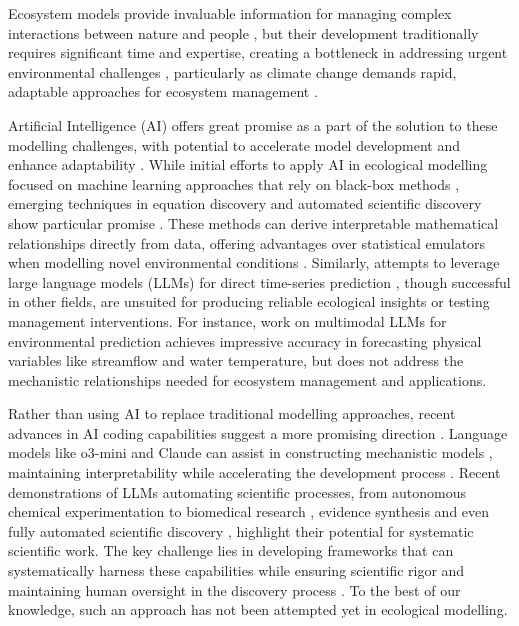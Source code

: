 Ecosystem models provide invaluable information for managing complex interactions between nature and people \citep{McCarthy2004, Holden2016}, but their development traditionally requires significant time and expertise, creating a bottleneck in addressing urgent environmental challenges \citep{Dichmont2017,Holden2024b}, particularly as climate change demands rapid, adaptable approaches for ecosystem management \citep{weiskopf2020climate,malhi2020climate}.

Artificial Intelligence (AI) offers great promise as a part of the solution to these modelling challenges, with potential to accelerate model development and enhance adaptability \citep{Spillias2024}. While initial efforts to apply AI in ecological modelling focused on machine learning approaches that rely on black-box methods \citep{morales2024developing}, emerging techniques in equation discovery and automated scientific discovery show particular promise \citep{Huntingford_Nicoll_Klein_Ahmad_2024,floryan2022data}. These methods can derive interpretable mathematical relationships directly from data, offering advantages over statistical emulators when modelling novel environmental conditions \citep{Schaeffer_2017,chen2024constructing,karniadakis2021physics}. Similarly, attempts to leverage large language models (LLMs) for direct time-series prediction \citep{zhang2024large,su2024large,hassani2024predictions,gandhi2024generative,bylund2024chatgpt,cao2023tempo,li2024lite,garza2023timegpt}, though successful in other fields, are unsuited for producing reliable ecological insights or testing management interventions. For instance, work on multimodal LLMs for environmental prediction \citep{li2024lite} achieves impressive accuracy in forecasting physical variables like streamflow and water temperature, but does not address the mechanistic relationships needed for ecosystem management and applications.

Rather than using AI to replace traditional modelling approaches, recent advances in AI coding capabilities suggest a more promising direction \citep{Xu2021}. Language models like o3-mini and Claude can assist in constructing mechanistic models \citep{Spillias2024}, maintaining interpretability while accelerating the development process \citep{TheRoyalSociety2024}. Recent demonstrations of LLMs automating scientific processes, from autonomous chemical experimentation \citep{burger2023autonomous} to biomedical research \citep{wang2024bioresearcher}, evidence synthesis \citep{spillias2024evaluating} and even fully automated scientific discovery \citep{kramer2023automated}, highlight their potential for systematic scientific work. The key challenge lies in developing frameworks that can systematically harness these capabilities while ensuring scientific rigor and maintaining human oversight in the discovery process \citep{kramer2023automated,Spillias2024}. To the best of our knowledge, such an approach has not been attempted yet in ecological modelling.

